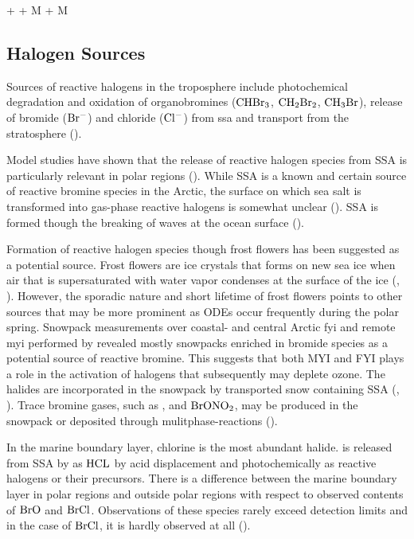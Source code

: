 \begin{reaction}
     +  + M \rightarrow {} + M
    \label{R:clono2}
\end{reaction}

\subsection{Halogen Sources}\label{sec:halogen_sources}

Sources of reactive halogens in the troposphere include photochemical degradation and oxidation of organobromines ($\mathrm{CHBr_3}$, $\mathrm{CH_2Br_2}$, $\mathrm{CH_3Br}$), release of bromide ($\mathrm{Br^-}$) and chloride ($\mathrm{Cl^-}$) from \acrfull{ssa} and transport from the stratosphere (\cite{Schmidt}). 

\medskip

Model studies have shown that the release of reactive halogen species from SSA is particularly relevant in polar regions (\cite{Schmidt}). While SSA is a known and certain source of reactive bromine species in the Arctic, the surface on which sea salt is transformed into gas-phase reactive halogens is somewhat unclear (\cite{Simpson2005}). SSA is formed though the breaking of waves at the ocean surface (\cite{Simpson2015}). 

\medskip

Formation of reactive halogen species though frost flowers has been suggested as a potential source. Frost flowers are ice crystals that forms on new sea ice when air that is supersaturated with water vapor condenses at the surface of the ice (\cite{GRANFORS2013124}, \cite{Kaleschke}). However, the sporadic nature and short lifetime of frost flowers points to other sources that may be more prominent as ODEs occur frequently during the polar spring. Snowpack measurements over coastal- and central Arctic \acrfull{fyi} and remote \acrfull{myi} performed by \cite{Peterson2019} revealed mostly snowpacks enriched in bromide species as a potential source of reactive bromine. This suggests that both MYI and FYI plays a role in the activation of halogens that subsequently may deplete ozone. The halides are incorporated in the snowpack by transported snow containing SSA (\cite{Toyota}, \cite{Peterson2019}). Trace bromine gases, such as ,  and $\mathrm{BrONO_2}$, may be produced in the snowpack or deposited through mulitphase-reactions (\cite{Simpson2005}). 


\medskip


In the marine boundary layer, chlorine is the most abundant halide.  is released from SSA by as $\mathrm{HCL}$ by acid displacement and photochemically as reactive halogens or their precursors. There is a difference between the marine boundary layer in polar regions and outside polar regions with respect to observed contents of $\mathrm{BrO}$ and $\mathrm{BrCl}$. Observations of these species rarely exceed detection limits and in the case of $\mathrm{BrCl}$, it is hardly observed at all (\cite{Simpson2015}). 

